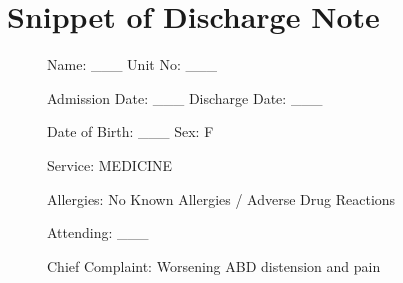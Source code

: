 \pagebreak
\section*{Snippet of Discharge Note}
\begin{figure}[!ht]
    \centering
\begin{tcolorbox}
Name:  \_\_\_                     Unit No:   \_\_\_
 
Admission Date:  \_\_\_              Discharge Date:   \_\_\_
 
Date of Birth:  \_\_\_             Sex:   F
 
Service: MEDICINE
 
Allergies: 
No Known Allergies / Adverse Drug Reactions
 
Attending: \_\_\_
 
Chief Complaint:
Worsening ABD distension and pain 
 

\end{tcolorbox}
\end{figure}
